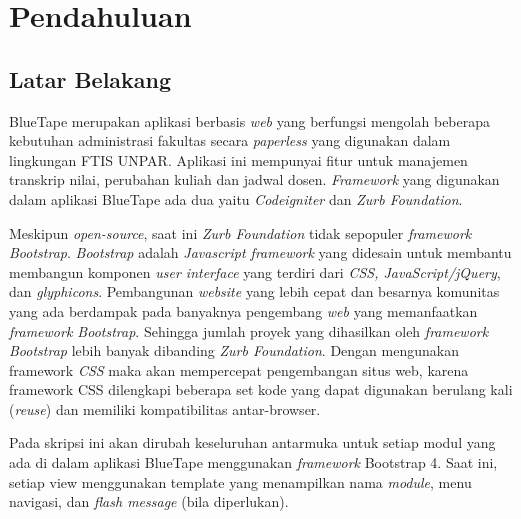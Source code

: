 \chapter{Pendahuluan}
\label{chap:intro}
   
\section{Latar Belakang}
\label{sec:label}


BlueTape merupakan aplikasi berbasis \textit{web} yang berfungsi mengolah beberapa kebutuhan administrasi fakultas secara \textit{paperless} yang digunakan dalam lingkungan FTIS UNPAR.  Aplikasi ini mempunyai fitur untuk manajemen transkrip nilai, perubahan kuliah dan jadwal dosen. \textit{Framework} yang digunakan dalam aplikasi BlueTape ada dua yaitu \textit{Codeigniter} dan \textit{Zurb Foundation}.  

Meskipun \textit{open-source}, saat ini \textit{Zurb Foundation} tidak sepopuler \textit{framework} \textit{Bootstrap}. 
\textit{Bootstrap} adalah \textit{ Javascript framework} yang didesain untuk membantu membangun komponen \textit{user interface} yang terdiri dari \textit{CSS, JavaScript/jQuery}, dan \textit{glyphicons}. Pembangunan \textit{website} yang lebih cepat dan besarnya komunitas yang ada berdampak pada banyaknya pengembang \textit{web} yang memanfaatkan \textit{framework Bootstrap}. Sehingga jumlah proyek yang dihasilkan oleh\textit{ framework Bootstrap} lebih banyak dibanding \textit{Zurb Foundation}. Dengan mengunakan framework \textit{CSS} maka akan mempercepat pengembangan situs web, karena framework CSS dilengkapi beberapa set kode yang dapat digunakan berulang kali (\textit{reuse}) dan memiliki kompatibilitas antar-browser. 

Pada skripsi ini akan dirubah keseluruhan  antarmuka untuk setiap modul yang ada di dalam aplikasi BlueTape menggunakan \textit{framework} Bootstrap 4. Saat ini, setiap view menggunakan template yang menampilkan nama \textit{module}, menu navigasi, dan \textit{flash message} (bila diperlukan).


